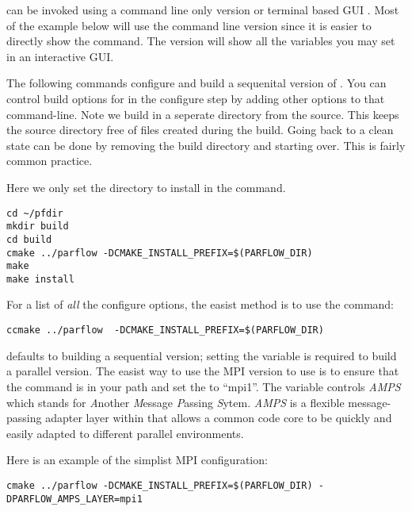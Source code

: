 \begin{enumerate}
\cmake{} can be invoked using a command line only version 
or terminal based GUI .  Most of the example below will
use the command line version since it is easier to directly show the
command.  The  version will show all the variables you
may set in an interactive GUI.

The following commands configure and build a sequenital version of
\parflow{}.  You can control build options for \parflow{} in the
\cmake{} configure step by adding other options to that command-line.
Note we build in a seperate directory from the source.  This keeps the
source directory free of files created during the build.  Going back
to a clean state can be done by removing the build directory and
starting over.  This is fairly common \cmake{} practice.

Here we only set the directory to install in the \cmake{} command.

\begin{display}\begin{verbatim}
cd ~/pfdir
mkdir build
cd build
cmake ../parflow -DCMAKE_INSTALL_PREFIX=$(PARFLOW_DIR) 
make 
make install
\end{verbatim}\end{display}

For a list of \emph{all} the \cmake{} configure options, the easist
method is to use the  command:

\begin{display}\begin{verbatim}
ccmake ../parflow  -DCMAKE_INSTALL_PREFIX=$(PARFLOW_DIR)
\end{verbatim}\end{display}

\parflow{} defaults to building a sequential version; setting the
 variable is required to build a parallel
version.  The easist way to use the MPI version to use is to ensure
that the  command is in your path and set the
 to ``mpi1''.  The 
variable controls \emph{AMPS} which stands for \emph{A}nother
\emph{M}essage \emph{P}assing \emph{S}ytem.  \emph{AMPS} is a flexible
message-passing adapter layer within \parflow{} that allows a common
code core to be quickly and easily adapted to different parallel
environments.

Here is an example of the simplist MPI configuration:

\begin{display}\begin{verbatim}
cmake ../parflow -DCMAKE_INSTALL_PREFIX=$(PARFLOW_DIR) -DPARFLOW_AMPS_LAYER=mpi1
\end{verbatim}\end{display}


\end{enumerate}
